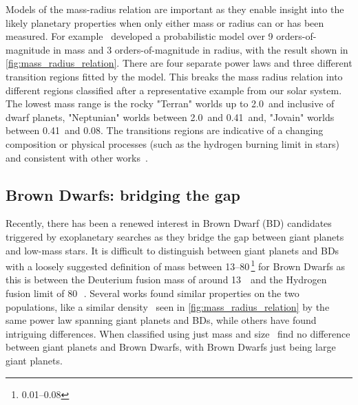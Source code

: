 Models of the mass-radius relation are important as they enable insight into the likely planetary properties when only either mass or radius can or has been measured.
For example~\citet{chen_probabilistic_2016} developed a probabilistic model over 9 orders-of-magnitude in mass and 3 orders-of-magnitude in radius, with the result shown in \cref{fig:mass_radius_relation}.
There are four separate power laws and three different transition regions fitted by the model.
This breaks the mass radius relation into different regions classified after a representative example from our solar system.
The lowest mass range is the rocky "Terran" worlds up to 2.0\,\Mearth{} and inclusive of dwarf planets, "Neptunian" worlds between 2.0\,\Mearth{} and 0.41\,\Mjup{} and, "Jovain" worlds between 0.41\,\Mjup{} and 0.08\Msun{}.
The transitions regions are indicative of a changing composition or physical processes (such as the hydrogen burning limit in stars) and consistent with other works~\citep[e.g.][]{weiss_mass_2013, dieterich_solar_2014, hatzes_definition_2015, rogers_most_2015}.

\subsection{Brown Dwarfs: bridging the gap}
Recently, there has been a renewed interest in Brown Dwarf (BD) candidates triggered by exoplanetary searches as they bridge the gap between giant planets and low-mass stars.
It is difficult to distinguish between giant planets and {BD}s with a loosely suggested definition of mass between 13--80\,\Mjup{}\footnote{0.01--0.08\Msun{}} for Brown Dwarfs as this is between the Deuterium fusion mass of around 13\,\Mjup{}~\citep[e.g.][]{spiegel_deuteriumburning_2011} and the Hydrogen fusion limit of 80\,\Mjup{}~\citep{chabrier_theory_2000, dieterich_solar_2014}.
Several works found similar properties on the two populations, like a similar density~\citep{hatzes_definition_2015, chen_probabilistic_2016} seen in \cref{fig:mass_radius_relation} by the same power law spanning giant planets and {BD}s, while others have found intriguing differences.
When classified using just mass and size~\citet{chen_probabilistic_2016} find no difference between giant planets and Brown Dwarfs, with Brown Dwarfs just being large giant planets.

